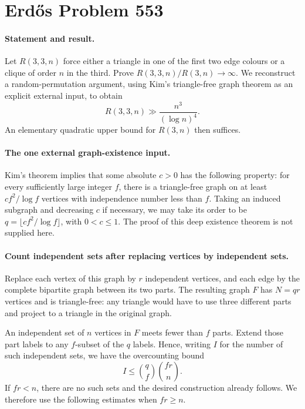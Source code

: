 \section*{Erd\H{o}s Problem 553}

\paragraph{Statement and result.}
Let \(R(3,3,n)\) force either a triangle in one of the first two
edge colours or a clique of order \(n\) in the third. Prove
\(R(3,3,n)/R(3,n)\to\infty\).
We reconstruct a random-permutation argument, using Kim's
triangle-free graph theorem as an explicit external input, to obtain
\[
 R(3,3,n)\gg \frac{n^3}{(\log n)^4}. \tag{1}
\]
An elementary quadratic upper bound for \(R(3,n)\) then suffices.

\paragraph{The one external graph-existence input.}
Kim's theorem implies that some absolute \(c>0\) has the following
property: for every sufficiently large integer \(f\), there is a
triangle-free graph on at least \(cf^2/\log f\) vertices with
independence number less than \(f\).
Taking an induced subgraph and decreasing \(c\) if necessary, we may
take its order to be \(q=\lfloor cf^2/\log f\rfloor\), with \(0<c\leq1\).
The proof of this deep existence theorem is not supplied here.

\paragraph{Count independent sets after replacing vertices by independent sets.}
Replace each vertex of this graph by \(r\) independent vertices,
and each edge by the complete bipartite graph between its two parts.
The resulting graph \(F\) has \(N=qr\) vertices and is triangle-free:
any triangle would have to use three different parts and project to
a triangle in the original graph.

An independent set of \(n\) vertices in \(F\) meets fewer than
\(f\) parts. Extend those part labels to any \(f\)-subset of the
\(q\) labels. Hence, writing \(I\) for the number of such independent
sets, we have the overcounting bound
\[
 I\leq\binom qf\binom{fr}{n}. \tag{2}
\]
If \(fr<n\), there are no such sets and the desired construction
already follows. We therefore use the following estimates when
\(fr\geq n\).

